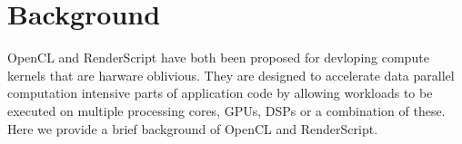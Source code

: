\section{Background}
\label{sec:background}

OpenCL and RenderScript have both been proposed for devloping compute kernels that
are harware oblivious.
They are designed to accelerate data parallel computation intensive parts of application
code by allowing workloads to be executed on multiple processing cores, GPUs,
DSPs or a combination of these. Here we provide a brief background of OpenCL and
RenderScript.



